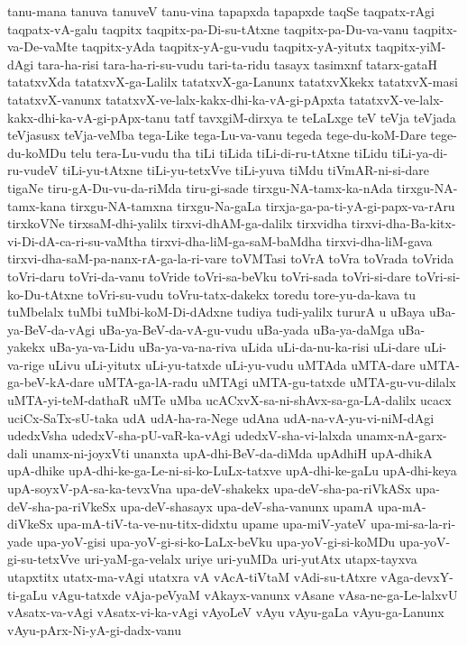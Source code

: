 {tanu-mana
tanuva
tanuveV
tanu-vina
tapapxda
tapapxde
taqSe
taqpatx-rAgi
taqpatx-vA-galu
taqpitx
taqpitx-pa-Di-su-tAtxne
taqpitx-pa-Du-va-vanu
taqpitx-va-De-vaMte
taqpitx-yAda
taqpitx-yA-gu-vudu
taqpitx-yA-yitutx
taqpitx-yiM-dAgi
tara-ha-risi
tara-ha-ri-su-vudu
tari-ta-ridu
tasayx
tasimxnf
tatarx-gataH
tatatxvXda
tatatxvX-ga-Lalilx
tatatxvX-ga-Lanunx
tatatxvXkekx
tatatxvX-masi
tatatxvX-vanunx
tatatxvX-ve-lalx-kakx-dhi-ka-vA-gi-pApxta
tatatxvX-ve-lalx-kakx-dhi-ka-vA-gi-pApx-tanu
tatf
tavxgiM-dirxya
te
teLaLxge
teV
teVja
teVjada
teVjasusx
teVja-veMba
tega-Like
tega-Lu-va-vanu
tegeda
tege-du-koM-Dare
tege-du-koMDu
telu
tera-Lu-vudu
tha
tiLi
tiLida
tiLi-di-ru-tAtxne
tiLidu
tiLi-ya-di-ru-vudeV
tiLi-yu-tAtxne
tiLi-yu-tetxVve
tiLi-yuva
tiMdu
tiVmAR-ni-si-dare
tigaNe
tiru-gA-Du-vu-da-riMda
tiru-gi-sade
tirxgu-NA-tamx-ka-nAda
tirxgu-NA-tamx-kana
tirxgu-NA-tamxna
tirxgu-Na-gaLa
tirxja-ga-pa-ti-yA-gi-papx-va-rAru
tirxkoVNe
tirxsaM-dhi-yalilx
tirxvi-dhAM-ga-dalilx
tirxvidha
tirxvi-dha-Ba-kitx-vi-Di-dA-ca-ri-su-vaMtha
tirxvi-dha-liM-ga-saM-baMdha
tirxvi-dha-liM-gava
tirxvi-dha-saM-pa-nanx-rA-ga-la-ri-vare
toVMTasi
toVrA
toVra
toVrada
toVrida
toVri-daru
toVri-da-vanu
toVride
toVri-sa-beVku
toVri-sada
toVri-si-dare
toVri-si-ko-Du-tAtxne
toVri-su-vudu
toVru-tatx-dakekx
toredu
tore-yu-da-kava
tu
tuMbelalx
tuMbi
tuMbi-koM-Di-dAdxne
tudiya
tudi-yalilx
tururA
u
uBaya
uBa-ya-BeV-da-vAgi
uBa-ya-BeV-da-vA-gu-vudu
uBa-yada
uBa-ya-daMga
uBa-yakekx
uBa-ya-va-Lidu
uBa-ya-va-na-riva
uLida
uLi-da-nu-ka-risi
uLi-dare
uLi-va-rige
uLivu
uLi-yitutx
uLi-yu-tatxde
uLi-yu-vudu
uMTAda
uMTA-dare
uMTA-ga-beV-kA-dare
uMTA-ga-lA-radu
uMTAgi
uMTA-gu-tatxde
uMTA-gu-vu-dilalx
uMTA-yi-teM-dathaR
uMTe
uMba
ucACxvX-sa-ni-shAvx-sa-ga-LA-dalilx
ucacx
uciCx-SaTx-sU-taka
udA
udA-ha-ra-Nege
udAna
udA-na-vA-yu-vi-niM-dAgi
udedxVsha
udedxV-sha-pU-vaR-ka-vAgi
udedxV-sha-vi-lalxda
unamx-nA-garx-dali
unamx-ni-joyxVti
unanxta
upA-dhi-BeV-da-diMda
upAdhiH
upA-dhikA
upA-dhike
upA-dhi-ke-ga-Le-ni-si-ko-LuLx-tatxve
upA-dhi-ke-gaLu
upA-dhi-keya
upA-soyxV-pA-sa-ka-tevxVna
upa-deV-shakekx
upa-deV-sha-pa-riVkASx
upa-deV-sha-pa-riVkeSx
upa-deV-shasayx
upa-deV-sha-vanunx
upamA
upa-mA-diVkeSx
upa-mA-tiV-ta-ve-nu-titx-didxtu
upame
upa-miV-yateV
upa-mi-sa-la-ri-yade
upa-yoV-gisi
upa-yoV-gi-si-ko-LaLx-beVku
upa-yoV-gi-si-koMDu
upa-yoV-gi-su-tetxVve
uri-yaM-ga-velalx
uriye
uri-yuMDa
uri-yutAtx
utapx-tayxva
utapxtitx
utatx-ma-vAgi
utatxra
vA
vAcA-tiVtaM
vAdi-su-tAtxre
vAga-devxY-ti-gaLu
vAgu-tatxde
vAja-peVyaM
vAkayx-vanunx
vAsane
vAsa-ne-ga-Le-lalxvU
vAsatx-va-vAgi
vAsatx-vi-ka-vAgi
vAyoLeV
vAyu
vAyu-gaLa
vAyu-ga-Lanunx
vAyu-pArx-Ni-yA-gi-dadx-vanu
}
